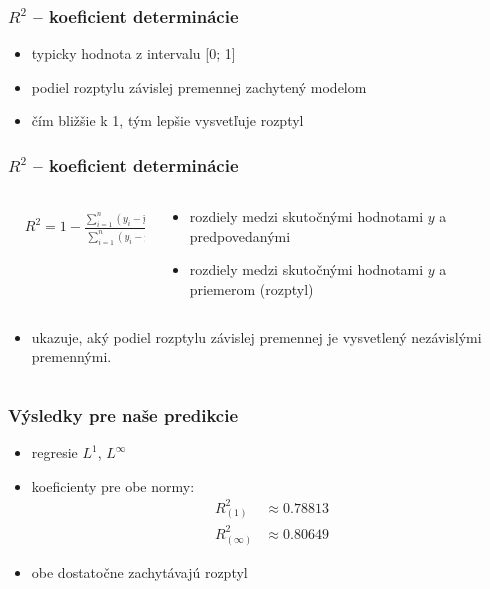 \documentclass[presentation.tex]{subfiles}
\begin{document}
	
	\begin{frame}
		\frametitle{$R^2$ -- koeficient determinácie }
		\begin{itemize}
			\item typicky hodnota z intervalu [0; 1]
			\item podiel rozptylu závislej premennej zachytený modelom
			\item čím bližšie k 1, tým lepšie vysvetľuje rozptyl
		\end{itemize}
		
		
		

	\end{frame}

	\begin{frame}
		\frametitle{$R^2$ -- koeficient determinácie}
		\begin{columns}
			\begin{column}{0.5\textwidth}
				\centering
				\begin{align*}
						&R^2 = 1 - \frac{\sum_{i=1}^{n} (y_i - \hat{y}_i)^2}{\sum_{i=1}^{n} (y_i - \bar{y})^2}
				\end{align*}
			\end{column}
			\begin{column}{0.5\textwidth}
				\begin{itemize}
					\item rozdiely medzi skutočnými hodnotami $y$ a predpovedanými
					\item  rozdiely medzi skutočnými hodnotami $y$ a priemerom (rozptyl)
				\end{itemize}
				
			\end{column}
		\end{columns}

		\begin{columns}
			\begin{column}{\textwidth}
			\begin{itemize}
				\item ukazuje, aký podiel rozptylu závislej premennej je vysvetlený nezávislými premennými.
			\end{itemize}
			\end{column}
		\end{columns}
	\end{frame}

	\begin{frame}
		\frametitle{Výsledky pre naše predikcie}
				\begin{itemize}
					\item regresie $L^1$, $L^{\infty}$
					\item koeficienty pre obe normy: 
					\begin{align*} 
						R^{2}_{(1)} &\approx  0.78813\\
						R^{2}_{(\infty)} &\approx 0.80649
					\end{align*}
					\item obe dostatočne zachytávajú rozptyl
				\end{itemize}
			
	\end{frame}
	
\end{document}
